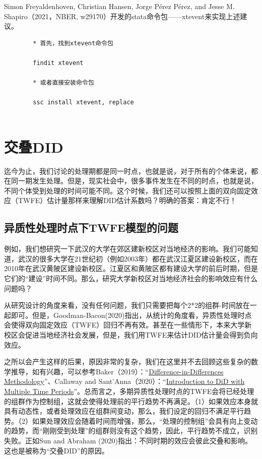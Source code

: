 \documentclass[cn,12pt,math=newtx,citestyle=gb7714-2015,bibstyle=gb7714-2015]{elegantbook}
\begin{document}
	Simon Freyaldenhoven, Christian Hansen, Jorge Pérez Pérez, and Jesse M. Shapiro（2021，NBER, w29170）开发的stata命令包——xtevent来实现上述建议。
	
	\begin{lstlisting}
		* 首先，找到xtevent命令包
		
		findit xtevent
		
		* 或者直接安装命令包
		
		ssc install xtevent, replace
		
	\end{lstlisting}
	
	
	
	\section{交叠DID}
	
	迄今为止，我们讨论的处理期都是同一时点，也就是说，对于所有的个体来说，都在同一期发生处理。但是，现实社会中，很多事件发生在不同的时点，也就是说，不同个体受到处理的时间可能不同。这个时候，我们还可以按照上面的双向固定效应（TWFE）估计量那样来理解DID估计系数吗？明确的答案：肯定不行！
	
	\subsection{异质性处理时点下TWFE模型的问题}
	
	例如，我们想研究一下武汉的大学在郊区建新校区对当地经济的影响。我们可能知道，武汉的很多大学在21世纪初（例如2003年）都在武汉江夏区建设新校区，而在2010年在武汉黄陂区建设新校区。江夏区和黄陂区都有建设大学的前后时期，但是它们的“建设”时间不同。那么，研究大学新校区对当地经济社会的影响效应有什么问题吗？
	
	从研究设计的角度来看，没有任何问题，我们只需要把每个2*2的组群-时间放在一起即可。但是，Goodman-Bacon(2020)指出，从统计的角度看，异质性处理时点会使得双向固定效应（TWFE）回归不再有效。甚至在一些情形下，本来大学新校区会促进当地经济社会发展，但是，我们用TWFE来估计DID估计量会得到负向效应。
	
	之所以会产生这样的后果，原因非常的复杂，我们在这里并不去回顾这些复杂的数学推导，如有兴趣，可以参考Baker（2019）：“\href{https://andrewcbaker.netlify.app/2019/09/25/difference-in-differences-methodology/}{Difference-in-Differences Methodology}”、Callaway and Sant’Anna（2020）：“\href{https://cran.r-project.org/web/packages/did/vignettes/multi-period-did.html}{Introduction to DiD with Multiple Time Periods}”。总而言之，多期异质性处理时点的TWFE会将已经处理的组群作为控制组，这就会使得处理前的平行趋势不再满足。（1）如果效应本身就具有动态性，或者处理效应在组群间变动，那么，我们设定的回归不满足平行趋势。（2）如果处理效应会随着时间而增强，那么，“处理的控制组”会具有向上变动的趋势，而“刚刚受到处理”的组群则没有这个趋势，因此，平行趋势不成立，识别失败。正如Sun and Abraham (2020)指出：不同时期的效应会彼此交叠和影响。这也是被称为“交叠DID”的原因。
	
\end{document}
